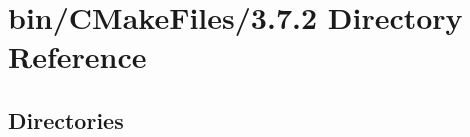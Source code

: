 \section{bin/\+C\+Make\+Files/3.7.2 Directory Reference}
\label{dir_fa2cbc6835c33f894b878bd58f6b08b4}
\subsection*{Directories}
\begin{DoxyCompactItemize}
\end{DoxyCompactItemize}
